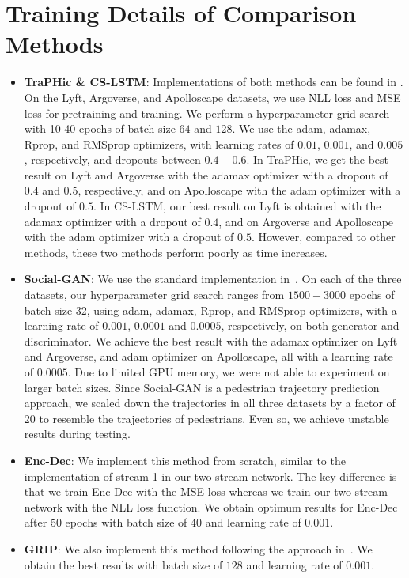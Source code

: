 \documentclass[10pt,twocolumn,letterpaper]{article}
\theoremstyle{plain}
\begin{document}
\section{Training Details of Comparison Methods}

\begin{itemize}
    \item \textbf{TraPHic \& CS-LSTM}: Implementations of both methods can be found in \cite{chandra2019robusttp}. On the Lyft, Argoverse, and Apolloscape datasets, we use NLL loss and MSE loss for pretraining and training. We perform a hyperparameter grid search with 10-40 epochs of batch size $64$ and $128$. We use the adam, adamax, Rprop, and RMSprop optimizers, with learning rates of $0.01$, $0.001$, and $0.005$, respectively, and dropouts between $0.4-0.6$. In TraPHic, we get the best result on Lyft and Argoverse with the adamax optimizer with a dropout of $0.4$ and $0.5$, respectively, and on Apolloscape with the adam optimizer with a dropout of $0.5$. In CS-LSTM, our best result on Lyft is obtained with the adamax optimizer with a dropout of $0.4$, and on Argoverse and Apolloscape with the adam optimizer with a dropout of $0.5$. However, compared to other methods, these two methods perform poorly as time increases.
    
    \item \textbf{Social-GAN}: We use the standard implementation in~\cite{social-gan}. On each of the three datasets, our hyperparameter grid search ranges from $1500-3000$ epochs of batch size $32$, using adam, adamax, Rprop, and RMSprop optimizers, with a learning rate of $0.001$, $0.0001$ and $0.0005$, respectively, on both generator and discriminator. We achieve the best result with the adamax optimizer on Lyft and Argoverse, and adam optimizer on Apolloscape, all with a learning rate of $0.0005$. Due to limited GPU memory, we were not able to experiment on larger batch sizes. Since Social-GAN is a pedestrian trajectory prediction approach, we scaled down the trajectories in all three datasets by a factor of $20$ to resemble the trajectories of pedestrians. Even so, we achieve unstable results during testing.


    \item \textbf{Enc-Dec}: We implement this method from scratch, similar to the implementation of stream 1 in our two-stream network. The key difference is that we train Enc-Dec with the MSE loss whereas we train our two stream network with the NLL loss function. We obtain optimum results for Enc-Dec after $50$ epochs with batch size of $40$ and learning rate of $0.001$.

    \item \textbf{GRIP}: We also implement this method following the approach in~\cite{li2019grip}. We obtain the best results with batch size of $128$ and learning rate of $0.001$. 


    
    
    

\end{itemize}








 
\end{document}
